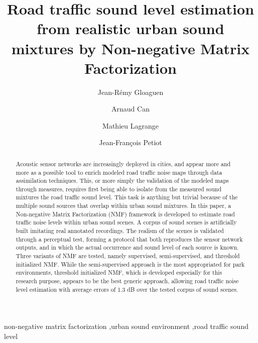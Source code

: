 \documentclass[review,5p,twocolumn,sort&compress,times]{elsarticle}
\begin{document}
\begin{frontmatter}

\title{Road traffic sound level estimation from realistic urban sound mixtures by Non-negative Matrix Factorization}

\author[ifsttar]{Jean-R\'emy Gloaguen}
\author[ifsttar]{Arnaud Can}
\author[ls2n]{Mathieu Lagrange}
\author[ls2n]{Jean-Fran\c cois Petiot}

\address[ifsttar]{Ifsttar Centre de Nantes, UMRAE, All\'ee des Ponts et Chauss\'es, 44344 Bouguenais, France}
\address[ls2n]{LS2N, 1 rue de No\"e, 44331 Nantes, France}

\begin{abstract}

Acoustic sensor networks are increasingly deployed in cities, and appear more and more as a possible tool to enrich modeled road traffic noise maps through data assimilation techniques. This, or more simply the validation of the modeled maps through measures, requires first being able to isolate from the measured sound mixtures the road traffic sound level. This task is anything but trivial because of the multiple sound sources that overlap within urban sound mixtures. In this paper, a Non-negative Matrix Factorization (NMF) framework is developed to estimate road traffic noise levels within urban sound scenes. A corpus of sound scenes is artificially built imitating real annotated recordings. The realism of the scenes is validated through a perceptual test, forming a protocol that both reproduces the sensor network outputs, and in which the actual occurrence and sound level of each source is known. Three variants of NMF are tested, namely supervised, semi-supervised, and threshold initialized NMF. While the semi-supervised approach is the most appropriated for park environments, threshold initialized NMF, which is developed especially for this research purpose, appears to be the best generic approach, allowing road traffic noise level estimation with average errors of 1.3 dB over the tested corpus of sound scenes.


\end{abstract}

\begin{keyword}
non-negative matrix factorization \sep urban sound environment \sep road traffic sound level
\end{keyword}

\end{frontmatter}
\end{document}
